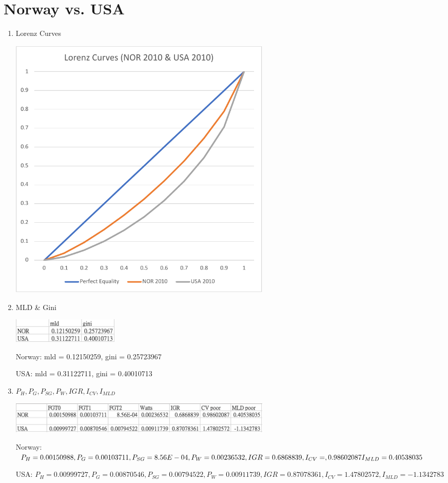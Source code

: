 \documentclass{article}[13pt]
\begin{document}
\newpage


\section{Norway vs. USA}

\begin{enumerate}
    \item{Lorenz Curves}
    
    \includegraphics[width=5in]{nor_usa_lorenz.pdf}

    \item{MLD \& Gini}
    
    \includegraphics[width=2in]{nor_usa_2.png}

    Norway: mld = 0.12150259, gini = 0.25723967

    USA: mld = 0.31122711, gini = 0.40010713

    \item{$P_H, P_G, P_{SG}, P_W, IGR, I_{CV}, I_{MLD}$}

    \includegraphics[width=5in]{nor_usa_1.png}

    Norway: $P_H = 0.00150988, P_G = 0.00103711, P_{SG} = 8.56E-04, P_W = 0.00236532, \newline IGR = 0.6868839, I_{CV} = ,0.98602087 I_{MLD} = 0.40538035$

    USA: $P_H = 0.00999727, P_G = 0.00870546, P_{SG} = 0.00794522, P_W = 0.00911739, IGR = 0.87078361, I_{CV} = 1.47802572, I_{MLD} = -1.1342783$

\end{enumerate}
\end{document}
